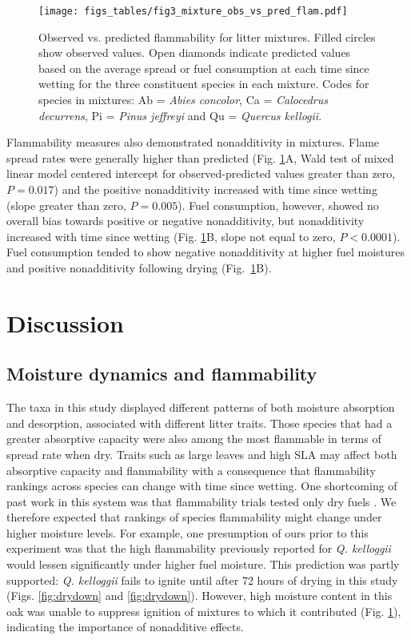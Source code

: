 \documentclass[letterpaper,12pt]{article}
\begin{document}
\begin{figure}
  \centering
\texttt{[image: figs\_tables/fig3\_mixture\_obs\_vs\_pred\_flam.pdf]}
\caption{Observed vs. predicted flammability for litter mixtures. Filled
  circles show observed values. Open diamonds indicate predicted values based
  on the average spread or fuel consumption at each time since wetting for the
  three constituent species in each mixture. Codes for species in mixtures: Ab
  = \emph{Abies concolor}, Ca = \emph{Calocedrus decurrens}, Pi = \emph{Pinus
    jeffreyi} and Qu = \emph{Quercus kellogii}.}
  \label{fig:mixture_obs_pred_flam}
\end{figure}

Flammability measures also demonstrated nonadditivity in mixtures. Flame spread
rates were generally higher than predicted (Fig.
\ref{fig:mixture_obs_pred_flam}A, Wald test of mixed linear model centered
intercept for observed-predicted values greater than zero, $P = 0.017$) and the
positive nonadditivity increased with time since wetting (slope greater than
zero, $P = 0.005$). Fuel consumption, however, showed no overall bias towards
positive or negative nonadditivity, but nonadditivity increased with time since
wetting (Fig. \ref{fig:mixture_obs_pred_flam}B, slope not equal to zero,
$P < 0.0001$). Fuel consumption tended to show negative nonadditivity at higher
fuel moistures and positive nonadditivity following drying
(Fig.~\ref{fig:mixture_obs_pred_flam}B).


\section*{Discussion}

\subsection*{Moisture dynamics and flammability}

The taxa in this study displayed different patterns of both moisture absorption
and desorption, associated with different litter traits. Those species that had
a greater absorptive capacity were also among the most flammable in terms of
spread rate when dry. Traits such as large leaves and high SLA may affect both
absorptive capacity and flammability with a consequence that flammability
rankings across species can change with time since wetting. One shortcoming of
past work in this system was that flammability trials tested only dry fuels
\citep{Magalhaes+Schwilk-2012}. We therefore expected that rankings of species
flammability might change under higher moisture levels. For example, one
presumption of ours prior to this experiment was that the high flammability
previously reported for \emph{Q. kelloggii} \citep{Magalhaes+Schwilk-2012}
would lessen significantly under higher fuel moisture. This prediction was
partly supported: \emph{Q. kelloggii} fails to ignite until after 72 hours of
drying in this study (Figs. \ref{fig:drydown} and \ref{fig:drydown}). However,
high moisture content in this oak was unable to suppress ignition of mixtures
to which it contributed (Fig. \ref{fig:mixture_obs_pred_flam}), indicating the
importance of nonadditive effects.
\end{document}
